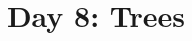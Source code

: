 \documentclass{article}
\begin{document}
\title{Day 8: Trees}
\author{}
\date{}
\maketitle


\end{document}
